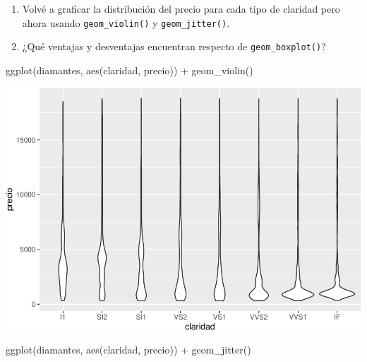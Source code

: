 \documentclass[
  openany]{book}
\newenvironment{Shaded}{\begin{snugshade}}{\end{snugshade}}
\newcommand{\FunctionTok}[1]{\textcolor[rgb]{0.00,0.00,0.00}{#1}}
\newcommand{\NormalTok}[1]{#1}
\newcommand{\SpecialCharTok}[1]{\textcolor[rgb]{0.00,0.00,0.00}{#1}}
\providecommand{\tightlist}{%
  \setlength{\itemsep}{0pt}\setlength{\parskip}{0pt}}
\begin{document}
\begin{enumerate}
\def\labelenumi{\arabic{enumi}.}
\tightlist
\item
  Volvé a graficar la distribución del precio para cada tipo de claridad pero ahora usando \texttt{geom\_violin()} y \texttt{geom\_jitter()}.
\item
  ¿Qué ventajas y desventajas encuentran respecto de \texttt{geom\_boxplot()}?
\end{enumerate}

\begin{Shaded}
\begin{Highlighting}[]
\FunctionTok{ggplot}\NormalTok{(diamantes, }\FunctionTok{aes}\NormalTok{(claridad, precio)) }\SpecialCharTok{+}
  \FunctionTok{geom\_violin}\NormalTok{() }
\end{Highlighting}
\end{Shaded}

\begin{center}\includegraphics[width=1\linewidth]{DT6_files/figure-latex/unnamed-chunk-69-1} \end{center}

\begin{Shaded}
\begin{Highlighting}[]
\FunctionTok{ggplot}\NormalTok{(diamantes, }\FunctionTok{aes}\NormalTok{(claridad, precio)) }\SpecialCharTok{+}
  \FunctionTok{geom\_jitter}\NormalTok{()}
\end{Highlighting}
\end{Shaded}
\end{document}
